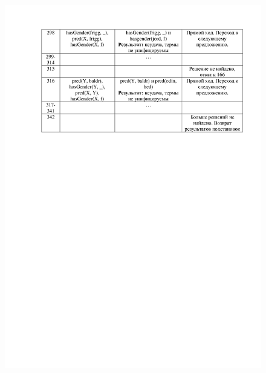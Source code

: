 \documentclass[12pt]{report}
\begin{document}
\begin{figure}[H]
	\centering
	\includegraphics[scale=0.32]{3.png}
	\label{fig:2}
\end{figure}
\end{document}
